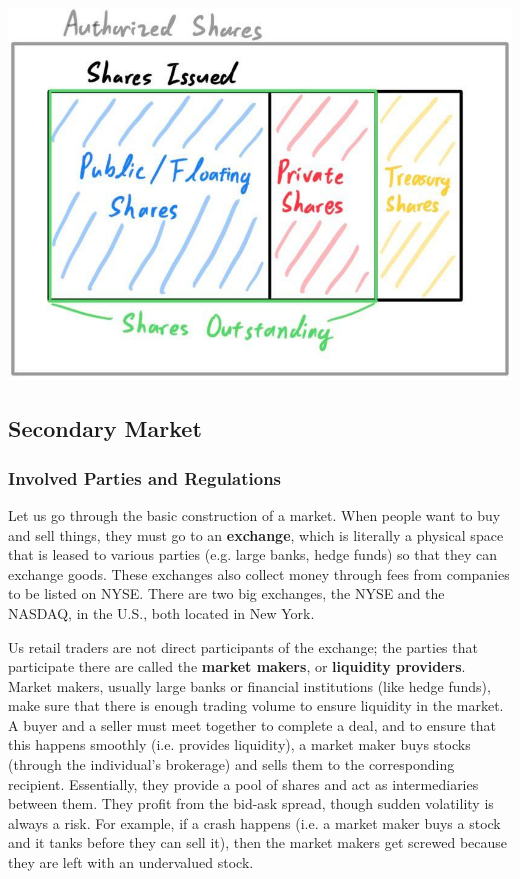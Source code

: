 \documentclass{article}
\begin{document}
  \begin{center}
      \includegraphics[scale=0.25]{img/Shares_Outstanding.jpg}
  \end{center}

  \subsection{Secondary Market}

  \subsubsection{Involved Parties and Regulations}

  Let us go through the basic construction of a market. When people want to buy and sell things, they must go to an \textbf{exchange}, which is literally a physical space that is leased to various parties (e.g. large banks, hedge funds) so that they can exchange goods. These exchanges also collect money through fees from companies to be listed on NYSE. There are two big exchanges, the NYSE and the NASDAQ, in the U.S., both located in New York. 

  Us retail traders are not direct participants of the exchange; the parties that participate there are called the \textbf{market makers}, or \textbf{liquidity providers}. Market makers, usually large banks or financial institutions (like hedge funds), make sure that there is enough trading volume to ensure liquidity in the market. A buyer and a seller must meet together to complete a deal, and to ensure that this happens smoothly (i.e. provides liquidity), a market maker buys stocks (through the individual's brokerage) and sells them to the corresponding recipient. Essentially, they provide a pool of shares and act as intermediaries between them. They profit from the bid-ask spread, though sudden volatility is always a risk. For example, if a crash happens (i.e. a market maker buys a stock and it tanks before they can sell it), then the market makers get screwed because they are left with an undervalued stock. 
\end{document}
